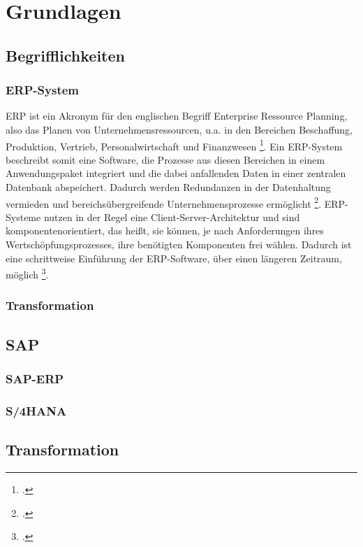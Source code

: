\section{Grundlagen}
\subsection{Begrifflichkeiten}
\subsubsection{ERP-System}
ERP ist ein Akronym für den englischen Begriff \glqq{}Enterprise Ressource Planning\grqq{}, also das Planen von Unternehmensressourcen, u.a. in den Bereichen Beschaffung, Produktion, Vertrieb, Personalwirtschaft und Finanzwesen \footcite[Vgl.][523]{wibuch}. Ein ERP-System beschreibt somit eine Software, die Prozesse aus diesen Bereichen in einem Anwendungspaket integriert und die dabei anfallenden Daten in einer zentralen Datenbank abspeichert. Dadurch werden Redundanzen in der Datenhaltung vermieden und bereichsübergreifende Unternehmensprozesse ermöglicht \footcite[Vgl.][523]{wibuch}. ERP-Systeme nutzen in der Regel eine Client-Server-Architektur und sind komponentenorientiert, das heißt, sie können, je nach Anforderungen ihres Wertschöpfungsprozesses, ihre benötigten Komponenten frei wählen. Dadurch ist eine schrittweise Einführung der ERP-Software, über einen längeren Zeitraum, möglich \footcite[Vgl.][524 f.]{wibuch}.

\subsubsection{Transformation}


\subsection{SAP}
\subsubsection{SAP-ERP}
\subsubsection{S/4HANA}

\subsection{Transformation}
